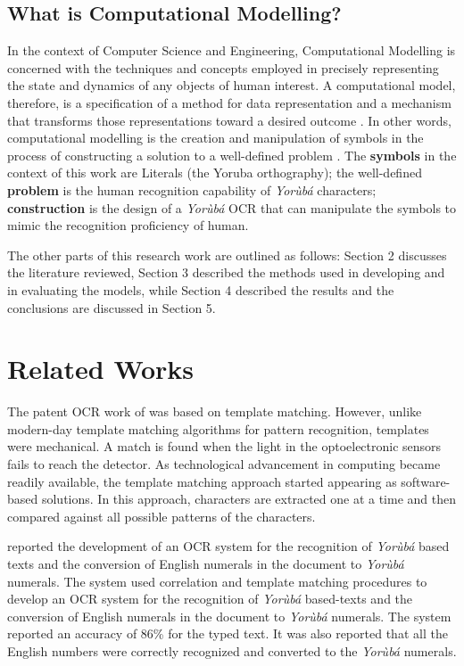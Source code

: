 \documentclass[review]{elsarticle}
\newcommand{\yor}{\textit{Yor\`ub\'a }}
\begin{document}
\subsection{What is Computational Modelling?}
In the context of Computer Science and Engineering, Computational Modelling is concerned with the techniques and concepts employed in precisely representing the state and dynamics of any objects of human interest. A computational model, therefore, is a specification of a method for data representation and a mechanism that transforms those representations toward a desired outcome \cite{denning2012closing}. In other words, computational modelling is the creation and manipulation of symbols in the process of constructing a solution to a well-defined problem \cite{ninan2013theoretical}. The \textbf{symbols} in the context of this work are Literals (the Yoruba orthography); the well-defined \textbf{problem} is the human recognition capability of \yor characters; \textbf{construction} is the design of a \yor OCR that can manipulate the symbols to mimic the recognition proficiency of human.

The other parts of this research work are outlined as follows: Section 2 discusses the literature reviewed, Section 3 described the methods used in developing and in evaluating the models, while Section 4 described the results and the conclusions are discussed in Section 5.

\section{Related Works}
The patent OCR work of \cite{tauschek1935reading} was based on template matching. However, unlike modern-day template matching algorithms for pattern recognition, templates were mechanical. A match is found when the light in the optoelectronic sensors fails to reach the detector. As technological advancement in computing became readily available, the template matching approach started appearing as software-based solutions. In this approach, characters are extracted one at a time and then compared against all possible patterns of the characters. 

\cite{oladayo2015yoruba} reported the development of an OCR system for the recognition of \yor based texts and the conversion of English numerals in the document to \yor numerals. The system used correlation and template matching procedures to develop an OCR system for the recognition of \yor based-texts and the conversion of English numerals in the document to \yor numerals. The system reported an accuracy of 86\% for the typed text. It was also reported that all the English numbers were correctly recognized and converted to the \yor numerals. 
\end{document}
